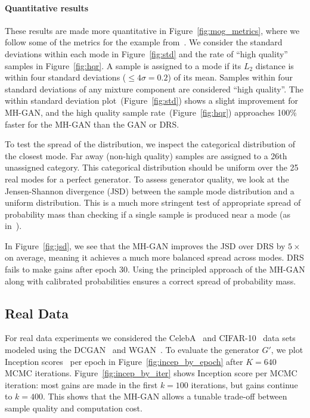 \documentclass{article}
\begin{document}
\paragraph{Quantitative results}
These results are made more quantitative in Figure~\ref{fig:mog_metrics}, where we follow some of the metrics for the example from~\citet{Azadi2018}.
We consider the standard deviations within each mode in Figure~\ref{fig:std} and the rate of ``high quality'' samples in Figure~\ref{fig:hqr}.
A sample is assigned to a mode if its $L_2$ distance is within four standard deviations ($\leq 4 \sigma = 0.2$) of its mean.
Samples within four standard deviations of any mixture component are considered ``high quality''.
The within standard deviation plot~(Figure~\ref{fig:std}) shows a slight improvement for MH-GAN, and the high quality sample rate~(Figure~\ref{fig:hqr}) approaches 100\% faster for the MH-GAN than the GAN or DRS\@.

To test the spread of the distribution, we inspect the categorical distribution of the closest mode.
Far away (non-high quality) samples are assigned to a 26th unassigned category.
This categorical distribution should be uniform over the 25 real modes for a perfect generator.
To assess generator quality, we look at the Jensen-Shannon divergence (JSD) between the sample mode distribution and a uniform distribution.
This is a much more stringent test of appropriate spread of probability mass than checking if a single sample is produced near a mode (as in~\citet{Azadi2018})\@.




In Figure~\ref{fig:jsd}, we see that the MH-GAN improves the JSD over DRS by $5 \times$ on average, meaning it achieves a much more balanced spread across modes.
DRS fails to make gains after epoch 30.
Using the principled approach of the MH-GAN along with calibrated probabilities ensures a correct spread of probability mass.

\subsection{Real Data}

For real data experiments we considered the CelebA~\citep{Liu2015} and CIFAR-10~\citep{Torralba2008} data sets modeled using the DCGAN~\citep{Radford2015} and WGAN~\citep{Arjovsky2017, Gulrajani2017}.
To evaluate the generator $G'$, we plot Inception scores~\citep{Salimans2016} per epoch in Figure~\ref{fig:incep_by_epoch} after $K=640$ MCMC iterations.
Figure~\ref{fig:incep_by_iter} shows Inception score per MCMC iteration:
most gains are made in the first $k=100$ iterations, but gains continue to $k=400$.
This shows that the MH-GAN allows a tunable trade-off between sample quality and computation cost.
\end{document}
